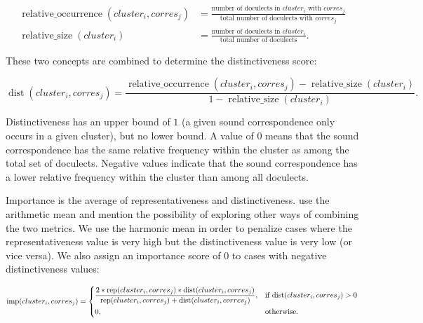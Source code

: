 \documentclass[a4paper]{article}
\begin{document}
\begin{adjustwidth}{-1cm}{-1cm}
\begin{align*}
\operatorname{relative\_occurrence}(cluster_i, corres_j) &= 
\frac{\text{number of doculects in } cluster_i \text{ with }  corres_j}
{\text{total number of doculects with } corres_j}\\
\operatorname{relative\_size}(cluster_i) &= 
\frac{\text{number of doculects in } cluster_i}
{\text{total number of doculects}}
.
\end{align*}
\end{adjustwidth}

These two concepts are combined to determine the distinctiveness score:

\begin{adjustwidth}{-1cm}{-1cm}
\begin{equation*}
\operatorname{dist}(cluster_i, corres_j) = 
\frac{\operatorname{relative\_occurrence}(cluster_i, corres_j) - \operatorname{relative\_size}(cluster_i)}
{1 - \operatorname{relative\_size}(cluster_i)}
.
\end{equation*}
\end{adjustwidth}

Distinctiveness has an upper bound of
$1$ (a given sound correspondence only occurs in a given cluster),
but no lower bound.
A value of $0$ means that the sound correspondence
has the same relative frequency within the cluster
as among the total set of doculects.
Negative values indicate that the sound correspondence
has a lower relative frequency within the cluster
than among all doculects.

Importance is the average of representativeness and distinctiveness.
\citet{wieling2011bipartite} use the arithmetic mean
and mention the possibility of exploring
other ways of combining the two metrics.
We use the harmonic mean in order to penalize cases
where the representativeness value is very high
but the distinctiveness value is very low (or vice versa).
We also assign an importance score of $0$ to
cases with negative distinctiveness values:

\begin{adjustwidth}{-3cm}{-3cm}
\begin{equation*}
\operatorname{imp}(cluster_i, corres_j) = 
\begin{dcases}
\frac{
2 * \operatorname{rep}(cluster_i, corres_j) * \operatorname{dist}(cluster_i, corres_j)}
{\operatorname{rep}(cluster_i, corres_j) + \operatorname{dist}(cluster_i, corres_j)}, & \text{if dist}(cluster_i, corres_j) > 0\\
0, & \text{otherwise}.
\end{dcases}
\end{equation*}
\end{adjustwidth}
\end{document}
